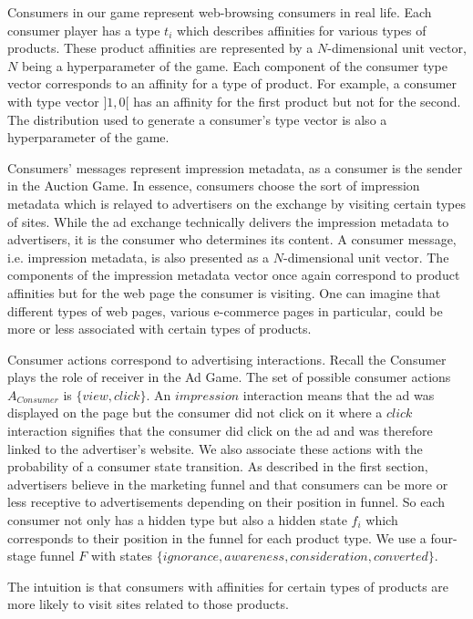 \documentclass{article}
\begin{document}
Consumers in our game represent web-browsing consumers in real life. Each consumer player has a type $t_i$ which describes affinities for various types of products. These product affinities are represented by a $N$-dimensional unit vector, $N$ being a hyperparameter of the game. Each component of the consumer type vector corresponds to an affinity for a type of product. For example, a consumer with type vector $\rbrack 1, 0 \lbrack$ has an affinity for the first product but not for the second. The distribution used to generate a consumer's type vector is also a hyperparameter of the game.

Consumers' messages represent impression metadata, as a consumer is the sender in the Auction Game. In essence, consumers choose the sort of impression metadata which is relayed to advertisers on the exchange by visiting certain types of sites. While the ad exchange technically delivers the impression metadata to advertisers, it is the consumer who determines its content. A consumer message, i.e. impression metadata, is also presented as a $N$-dimensional unit vector. The components of the impression metadata vector once again correspond to product affinities but for the web page the consumer is visiting. One can imagine that different types of web pages, various e-commerce pages in particular, could be more or less associated with certain types of products. 

Consumer actions correspond to advertising interactions. Recall the Consumer plays the role of receiver in the Ad Game. The set of possible consumer actions $A_{Consumer}$ is $\{view, click\}$. An $impression$ interaction means that the ad was displayed on the page but the consumer did not click on it where a $click$ interaction signifies that the consumer did click on the ad and was therefore linked to the advertiser's website. We also associate these actions with the probability of a consumer state transition. As described in the first section, advertisers believe in the marketing funnel and that consumers can be more or less receptive to advertisements depending on their position in funnel. So each consumer not only has a hidden type but also a hidden state $f_i$ which corresponds to their position in the funnel for each product type. We use a four-stage funnel $F$ with states $\{ignorance, awareness, consideration, converted\}$. 

The intuition is that consumers with affinities for certain types of products are more likely to visit sites related to those products.
\end{document}
